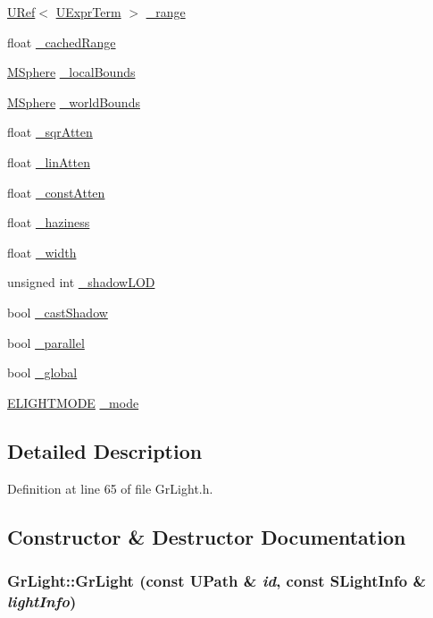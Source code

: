 \begin{CompactItemize}
\hyperlink{class_u_ref}{URef}$<$ \hyperlink{class_u_expr_term}{UExprTerm} $>$ \hyperlink{class_gr_light_e658483426095681c1fa182817964df8}{\_\-range}
\item 
float \hyperlink{class_gr_light_1f981e227788c6ffdb67a784cfb5fc0a}{\_\-cachedRange}
\item 
\hyperlink{class_m_sphere}{MSphere} \hyperlink{class_gr_light_b36a7430015dff850df027736b1bc01c}{\_\-localBounds}
\item 
\hyperlink{class_m_sphere}{MSphere} \hyperlink{class_gr_light_d6fc31fefe05cf233361472e01aa0964}{\_\-worldBounds}
\item 
float \hyperlink{class_gr_light_efd74a6030d308c8ddbb6d1694b83da2}{\_\-sqrAtten}
\item 
float \hyperlink{class_gr_light_27da8da902b606390ff4317d4b99aac0}{\_\-linAtten}
\item 
float \hyperlink{class_gr_light_561e3666c6af8ff045d49e4b1b1d84cb}{\_\-constAtten}
\item 
float \hyperlink{class_gr_light_8afa1f0c0b67e9019c659ef97a840110}{\_\-haziness}
\item 
float \hyperlink{class_gr_light_b80ea703a480e16f78ab3020983f4630}{\_\-width}
\item 
unsigned int \hyperlink{class_gr_light_7d00fdeecaa254a552fbea55e82ea644}{\_\-shadowLOD}
\item 
bool \hyperlink{class_gr_light_14d77a9c1e384353535a4a16f3f7b9a3}{\_\-castShadow}
\item 
bool \hyperlink{class_gr_light_e8e076faf998d07720755a05537af503}{\_\-parallel}
\item 
bool \hyperlink{class_gr_light_4e23b3f45bcd5f1a33352286db1effb9}{\_\-global}
\item 
\hyperlink{_gr_light_8h_8874b04c94d261f583fc693b4d7c866e}{ELIGHTMODE} \hyperlink{class_gr_light_e99e12ad16003bec82de9a31eb859d5d}{\_\-mode}
\end{CompactItemize}


\subsection{Detailed Description}


Definition at line 65 of file GrLight.h.

\subsection{Constructor \& Destructor Documentation}
\hypertarget{class_gr_light_65657d71433a1ea8ff3639faa63347a0}{
\subsubsection[{GrLight}]{\setlength{\rightskip}{0pt plus 5cm}GrLight::GrLight (const {\bf UPath} \& {\em id}, \/  const {\bf SLightInfo} \& {\em lightInfo})}}
\label{class_gr_light_65657d71433a1ea8ff3639faa63347a0}




